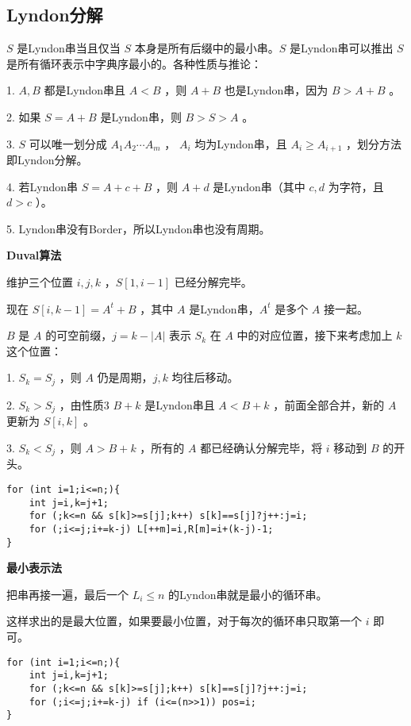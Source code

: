 \newpage

\subsection{Lyndon分解}

$S$ 是Lyndon串当且仅当 $S$ 本身是所有后缀中的最小串。$S$ 是Lyndon串可以推出 $S$ 是所有循环表示中字典序最小的。各种性质与推论：

1. $A,B$ 都是Lyndon串且 $A<B$ ，则 $A+B$ 也是Lyndon串，因为 $B>A+B$ 。

2. 如果 $S=A+B$ 是Lyndon串，则 $B>S>A$ 。

3. $S$ 可以唯一划分成 $A_1A_2\cdots A_m$ ， $A_i$ 均为Lyndon串，且 $A_i\ge A_{i+1}$ ，划分方法即Lyndon分解。

4. 若Lyndon串 $S=A+c+B$ ，则 $A+d$ 是Lyndon串（其中 $c,d$ 为字符，且 $d>c$ ）。

5. Lyndon串没有Border，所以Lyndon串也没有周期。

\textbf{Duval算法}

维护三个位置 $i,j,k$ ，$S[1,i-1]$ 已经分解完毕。

现在 $S[i,k-1]=A^{t}+B$ ，其中 $A$ 是Lyndon串，$A^t$ 是多个 $A$ 接一起。

$B$ 是 $A$ 的可空前缀，$j=k-|A|$ 表示 $S_k$ 在 $A$ 中的对应位置，接下来考虑加上 $k$ 这个位置：

1. $S_k=S_j$ ，则 $A$ 仍是周期，$j,k$ 均往后移动。

2. $S_k>S_j$ ，由性质3 $B+k$ 是Lyndon串且 $A<B+k$ ，前面全部合并，新的 $A$ 更新为 $S[i,k]$ 。

3. $S_k<S_j$ ，则 $A>B+k$ ，所有的 $A$ 都已经确认分解完毕，将 $i$ 移动到 $B$ 的开头。

\begin{lstlisting}
for (int i=1;i<=n;){
	int j=i,k=j+1;
	for (;k<=n && s[k]>=s[j];k++) s[k]==s[j]?j++:j=i;
	for (;i<=j;i+=k-j) L[++m]=i,R[m]=i+(k-j)-1;
}
\end{lstlisting}

\textbf{最小表示法}

把串再接一遍，最后一个 $L_i\le n$ 的Lyndon串就是最小的循环串。

这样求出的是最大位置，如果要最小位置，对于每次的循环串只取第一个 $i$ 即可。

\begin{lstlisting}
for (int i=1;i<=n;){
	int j=i,k=j+1;
	for (;k<=n && s[k]>=s[j];k++) s[k]==s[j]?j++:j=i;
	for (;i<=j;i+=k-j) if (i<=(n>>1)) pos=i;
}
\end{lstlisting}

